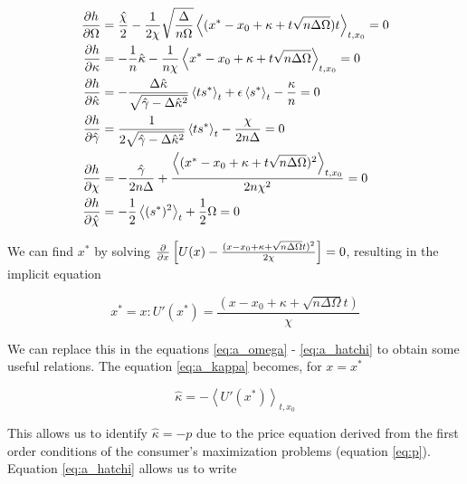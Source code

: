 \begin{align}
  \frac{\partial h}{\partial \Omega} & = \frac{\hat{\chi}}{2} -
  \frac{1}{2\chi} \sqrt{\frac{\Delta}{n\Omega}}\left\langle (x^* - x_0
  + \kappa + t \sqrt{n\Delta\Omega})t\right \rangle_{t,x_0} = 0   \label{eq:a_omega}\\
  \frac{\partial h}{\partial \kappa} & = -\frac{1}{n}\hat{\kappa} -
  \frac{1}{n\chi}\left\langle x^* - x_0 + \kappa +
    t\sqrt{n\Delta\Omega} \right \rangle_{t,x_0} = 0  \label{eq:a_kappa} \\
  \frac{\partial h}{\partial \hat{\kappa}} & = -\frac{\Delta\hat{\kappa}}{\sqrt{\hat{\gamma} - \Delta
      \hat{\kappa}^2}} \left\langle t s^*\right\rangle_t + \epsilon
  \left\langle s^*\right\rangle_t - \frac{\kappa}{n} = 0 \label{eq:a_hatkappa}\\
  \frac{\partial h}{\partial \hat{\gamma}} & = \frac{1}{2\sqrt{\hat{\gamma} - \Delta
      \hat{\kappa}^2}} \left\langle t s^*\right\rangle_t -
  \frac{\chi}{2n\Delta} = 0\label{eq:a_gamma}\\
  \frac{\partial h}{\partial \chi} & = - \frac{\hat{\gamma}}{2n\Delta} + \frac{\left\langle (x^* - x_0 + \kappa +
    t\sqrt{n\Delta\Omega})^2 \right \rangle_{t,x_0}}{2n\chi^2} = 0\label{eq:a_chi}\\
  \frac{\partial h}{\partial \hat{\chi}} & = -\frac{1}{2} \left\langle (s^*)^2
  \right\rangle_t + \frac{1}{2} \Omega = 0\label{eq:a_hatchi}
\end{align}

We can find $x^\ast$ by solving $\frac{\partial}{\partial x} \left[U(x) - \frac{(x - x_0 + \kappa + \sqrt{n\Delta\Omega}t)^2}{2\chi}\right] = 0$, resulting in the implicit equation

\begin{equation}
  \label{eq:a_55}
  x^* = x : U'(x^*) = \frac{(x - x_0 + \kappa +
      \sqrt{n\Delta\Omega}t)}{\chi}
\end{equation}

We can replace this in the equations \eqref{eq:a_omega} - \eqref{eq:a_hatchi} to obtain some useful relations. The equation \eqref{eq:a_kappa} becomes, for $x = x^*$

\begin{equation}
  \label{eq:a_56}
  \hat{\kappa} = -\left \langle U'(x^*) \right \rangle_{t,x_0}
\end{equation}

This allows us to identify $\hat{\kappa} = -p$ due to the price equation derived from the first order conditions of the consumer's maximization problems (equation \eqref{eq:p}). Equation \eqref{eq:a_hatchi} allows us to write

